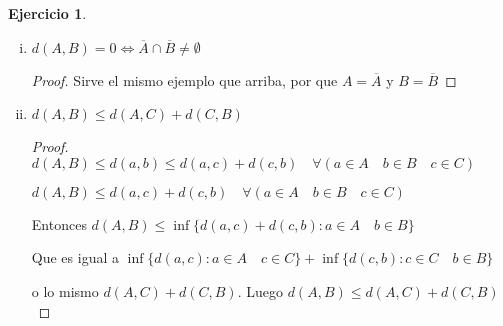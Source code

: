 \documentclass[11pt]{report}
\newcommand{\N}{\mathbb{N}}
\newcommand{\ra}{\rightarrow}
\newcommand{\ol}{\overline}
\theoremstyle{definition}
\newtheorem*{remark}{Observación}
\newtheorem{ej}{Ejercicio}
\begin{document}
\begin{ej}
\begin{enumerate}[i)]
\begin{proof}
	Sean $A = \{(x,0): x \in \N\} \quad B= \{(x,\frac{1}{x}): x \in \N \}$ 

	Sabemos que $A \cap B = \emptyset$ , sin embargo es facil ver que $d(A,B) = 0$. 

	Tomamos la sucesión $x_n = d((n,0), (n , \frac{1}{n})) = \sqrt{\frac{1}{n^2}}$. 
	
	$(x_n)_n \subseteq \{d(a,b) : a\in A \quad b \in B\}$ y además $x_n \ra 0$

	Y además por ser distancias, 0 es cota inferiór del conjunto. Por lo tanto $0$ es ínfimo

	La vuelta vale, y es trivial demostrarlo.

	\begin{remark}

	Un ejemplo mucho mas trivial es $A = (0,1)$ y $B= (1,2)$

	Si agarramos $a_n = d(1-\frac{1}{n},1+\frac{1}{n})$ tenemos que $(a_n)_n \subseteq d(A,B)$

	Y es facil ver que $a_n \ra d(1,1) = 0$ entonces tenemos una sucesión en $d(A,B)$ que converge a $0$.

	Y además sabemos que cero es cota inferiór de este conjunto por que ningun distancia puede ser menor que 0.

	Entonces $0$ es infimo del conjunto , por lo tanto $d(A,B) = 0$ sin embargo $A \cap B = \emptyset$
	
	\end{remark}
      \end{proof}
    \item $d(A,B) = 0 \iff \ol A \cap \ol B \neq \emptyset$
      \begin{proof}
	Sirve el mismo ejemplo que arriba, por que $A = \ol A$ y $B = \ol B$

      \end{proof}
    \item $d(A,B) \leq d(A,C) + d(C,B)$
      \begin{proof}
	$d(A,B)  \leq d(a,b) \leq d(a,c) + d(c,b) \quad \forall (a \in A \quad b \in B \quad c \in C)$

      $d(A,B) \leq d(a,c) + d(c,b) \quad \forall (a \in A \quad b \in B \quad c \in C)$ 

      Entonces $d(A,B) \leq \inf \{d(a,c) + d(c,b) : a \in A \quad b \in B\}$

      Que es igual a  $ \inf \{d(a,c) :  a \in A \quad c \in C\} + \inf \{d(c,b): c \in C \quad b \in B\}$

      o lo mismo $d(A,C) + d(C,B)$. Luego $d(A,B) \leq d(A,C) + d(C,B)$


\end{proof}
\end{enumerate}
\end{ej}
\end{document}

